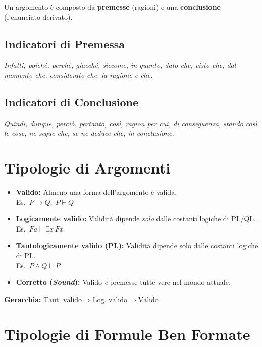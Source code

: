 \documentclass[10pt,a4paper]{article}
\newcommand{\proves}{\vdash}
\begin{document}
Un argomento è composto da \textbf{premesse} (ragioni) e una \textbf{conclusione}
(l'enunciato derivato).

\subsection*{Indicatori di Premessa}
\textit{Infatti, poiché, perché, giacché, siccome, in quanto, dato che,
visto che, dal momento che, considerato che, la ragione è che.}

\subsection*{Indicatori di Conclusione}
\textit{Quindi, dunque, perciò, pertanto, così, ragion per cui,
di conseguenza, stando così le cose, ne segue che, se ne deduce che,
in conclusione.}

\newpage
\section{Tipologie di Argomenti}

\begin{definizione}
\begin{itemize}[leftmargin=*, itemsep=1pt, topsep=0pt]
  \item \textbf{Valido:} Almeno una forma dell'argomento è valida.\\
    Es.\ $P \to Q,\; P \proves Q$
  \item \textbf{Logicamente valido:} Validità dipende \emph{solo} dalle
    costanti logiche di PL/QL.\\
    Es.\ $Fa \proves \exists x\, Fx$
  \item \textbf{Tautologicamente valido (PL):} Validità dipende solo
    dalle costanti logiche di PL.\\
    Es.\ $P \land Q \proves P$
  \item \textbf{Corretto (\textit{Sound}):} Valido \emph{e} premesse
    tutte vere nel mondo attuale.
\end{itemize}
\end{definizione}

\textbf{Gerarchia:}
$\text{Taut.\ valido} \Rightarrow \text{Log.\ valido} \Rightarrow \text{Valido}$

\newpage
\section{Tipologie di Formule Ben Formate}
\end{document}
